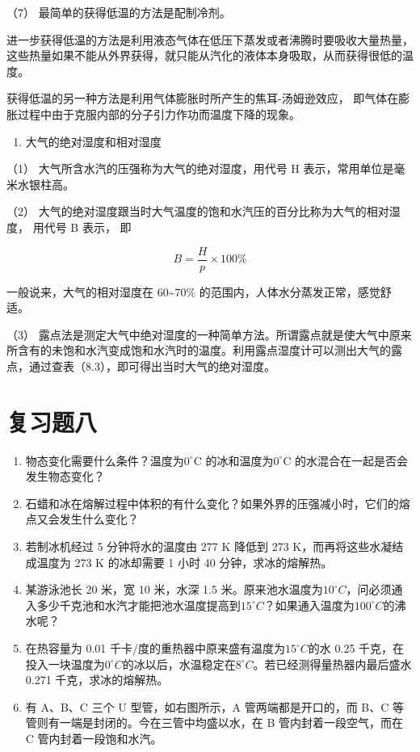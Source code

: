 （7） 最简单的获得低温的方法是配制冷剂。

进一步获得低温的方法是利用液态气体在低压下蒸发或者沸腾时要吸收大量热量，这些热量如果不能从外界获得，就只能从汽化的液体本身吸取，从而获得很低的温度。

获得低温的另一种方法是利用气体膨胀时所产生的焦耳-汤姆逊效应，
即气体在膨胀过程中由于克服内部的分子引力作功而温度下降的现象。

\begin{enumerate}
\def\labelenumi{\arabic{enumi}.}
\setcounter{enumi}{2}
\tightlist
\item
  大气的绝对湿度和相对湿度
\end{enumerate}

（1） 大气所含水汽的压强称为大气的绝对湿度，用代号 H
表示，常用单位是毫米水银柱高。

（2）
大气的绝对湿度跟当时大气温度的饱和水汽压的百分比称为大气的相对湿度，
用代号 B 表示， 即

\[
B=\frac{H}{p}\times100\%
\]

一般说来，大气的相对湿度在 60\textasciitilde70\%
的范围内，人体水分蒸发正常，感觉舒适。

（3）
露点法是测定大气中绝对湿度的一种简单方法。所谓露点就是使大气中原来所含有的未饱和水汽变成饱和水汽时的温度。利用露点湿度计可以测出大气的露点，通过查表（8.3），即可得出当时大气的绝对湿度。

\section{复习题八}\label{ux590dux4e60ux9898ux516b}

\begin{enumerate}
\def\labelenumi{\arabic{enumi}.}
\item
  物态变化需要什么条件？温度为\(0^{\circ}\)C 的冰和温度为\(0^{\circ}\)C
  的水混合在一起是否会发生物态变化？
\item
  石蜡和冰在熔解过程中体积的有什么变化？如果外界的压强减小时，它们的熔点又会发生什么变化？
\item
  若制冰机经过 5 分钟将水的温度由 277 K 降低到 273
  K，而再将这些水凝结成温度为 273 K 的冰却需要 1 小时 40
  分钟，求冰的熔解热。
\item
  某游泳池长 20 米，宽 10 米，水深 1.5
  米。原来池水温度为\(10^{\circ}C\)，问必须通入多少千克池和水汽才能把池水温度提高到\(15^{\circ}C\)？如果通入温度为\(100^{\circ}C\)的沸水呢？
\item
  在热容量为 0.01 千卡/度的重热器中原来盛有温度为\(15^{\circ}C\)的水
  0.25
  千克，在投入一块温度为\(0^{\circ}C\)的冰以后，水温稳定在\(8^{\circ}C\)。若已经测得量热器内最后盛水
  0.271 千克，求冰的熔解热。
\item
  有 A、B、C 三个 U 型管，如右图所示，A 管两端都是开口的，而 B、C
  等管则有一端是封闭的。今在三管中均盛以水，在 B 管内封着一段空气，而在
  C 管内封着一段饱和水汽。
\end{enumerate}

